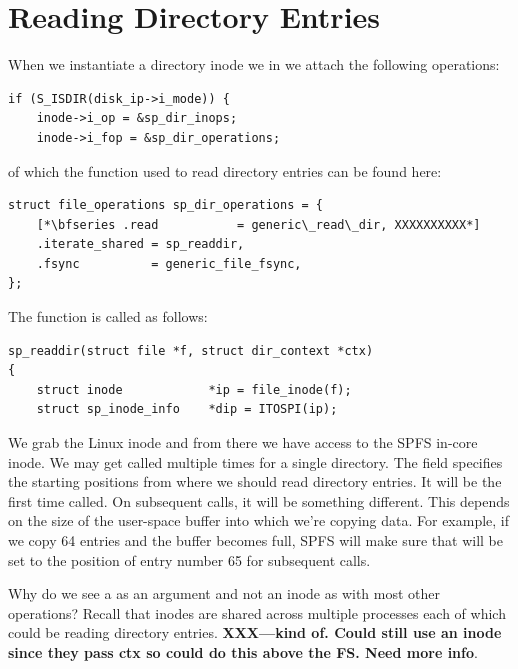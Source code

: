 
\section{Reading Directory Entries}\label{diskfs-statfs}

When we instantiate a directory inode we in  we attach the following operations:

\begin{lstlisting}
if (S_ISDIR(disk_ip->i_mode)) {
	inode->i_op = &sp_dir_inops;
	inode->i_fop = &sp_dir_operations;
\end{lstlisting}

\noindent
of which the function used to read directory entries can be found here:

\begin{lstlisting}
struct file_operations sp_dir_operations = {
	[*\bfseries .read           = generic\_read\_dir, XXXXXXXXXX*]
	.iterate_shared = sp_readdir,
	.fsync          = generic_file_fsync,
};
\end{lstlisting}

\noindent
The  function is called as follows:

\begin{lstlisting}
sp_readdir(struct file *f, struct dir_context *ctx)
{           
	struct inode            *ip = file_inode(f);
	struct sp_inode_info    *dip = ITOSPI(ip);
\end{lstlisting}

\noindent
We grab the Linux inode and from there we have access to the SPFS in-core inode. We may get called multiple times for a single directory. The  field specifies the starting positions from where we should read directory entries. It will be  the first time called. On subsequent calls, it will be something different. This depends on the size of the user-space buffer into which we're copying data. For example, if we copy 64 entries and the buffer becomes full, SPFS will make sure that  will be set to the position of entry number 65 for subsequent calls.

Why do we see a  as an argument and not an inode as with most other operations? Recall that inodes are shared across multiple processes each of which could be reading directory entries. {\bfseries XXX---kind of. Could still use an inode since they pass ctx so could do this above the FS. Need more info}.

